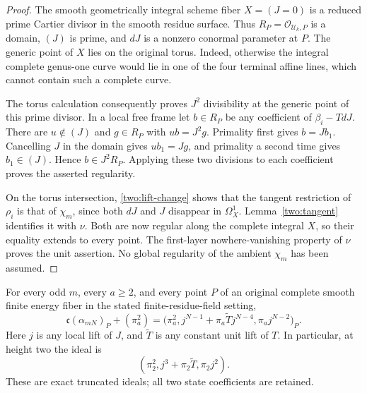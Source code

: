 \begin{proof}
The smooth geometrically integral scheme fiber $X=(J=0)$
is a reduced prime Cartier divisor in the smooth residue
surface. Thus $R_P=\mathcal O_{\mathcal U_k,P}$ is a domain,
$(J)$ is prime, and $dJ$ is a nonzero conormal parameter at
$P$. The generic point of $X$ lies on the original torus.
Indeed, otherwise the integral complete genus-one curve
would lie in one of the four terminal affine lines, which
cannot contain such a complete curve.

The torus calculation consequently proves $J^2$ divisibility
at the generic point of this prime divisor. In a local free
frame let $b\in R_P$ be any coefficient of $\beta_i-TdJ$.
There are $u\notin(J)$ and $g\in R_P$ with $ub=J^2g$.
Primality first gives $b=Jb_1$. Cancelling $J$ in the domain
gives $ub_1=Jg$, and primality a second time gives
$b_1\in(J)$. Hence $b\in J^2R_P$. Applying these two
divisions to each coefficient proves the asserted regularity.

On the torus intersection, \eqref{two:lift-change} shows that
the tangent restriction of $\rho_i$ is that of $\chi_m$,
since both $dJ$ and $J$ disappear in $\Omega_X^1$.
Lemma~\ref{two:tangent} identifies it with $\nu$. Both are
now regular along the complete integral $X$, so their equality
extends to every point. The first-layer nowhere-vanishing
property of $\nu$ proves the unit assertion. No global
regularity of the ambient $\chi_m$ has been assumed.
\end{proof}

\begin{theorem}
\label{two:ideal}
For every odd $m$, every $a\ge2$, and every point $P$ of an
original complete smooth finite energy fiber in the stated
finite-residue-field setting,
\begin{equation}
 \mathfrak c(\alpha_{mN})_P+(\pi_a^2)
 =\bigl(\pi_a^2,
         j^{N-1}+\pi_a\widetilde Tj^{N-4},
         \pi_a j^{N-2}\bigr)_P.
 \label{two:ideal-equation}
\end{equation}
Here $j$ is any local lift of $J$, and $\widetilde T$ is any
constant unit lift of $T$. In particular, at height two the
ideal is
\begin{equation}
 (\pi_2^2,j^3+\pi_2\widetilde T,\pi_2j^2).
 \label{two:height-two-ideal}
\end{equation}
These are exact truncated ideals; all two state coefficients
are retained.
\end{theorem}

